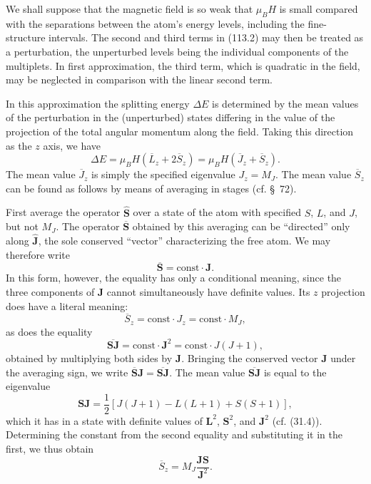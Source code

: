 We shall suppose that the magnetic field is so weak that $\mu_BH$ is small compared with the separations between the atom's energy levels, including the fine-structure intervals. The second and third terms in (113.2) may then be treated as a perturbation, the unperturbed levels being the individual components of the multiplets. In first approximation, the third term, which is quadratic in the field, may be neglected in comparison with the linear second term.

In this approximation the splitting energy $\Delta E$ is determined by the mean values of the perturbation in the (unperturbed) states differing in the value of the projection of the total angular momentum along the field. Taking this direction as the $z$ axis, we have
\begin{equation}
 \Delta E=\mu_BH(\overline L_z+2\overline S_z)=\mu_BH(\overline J_z+\overline S_z).
 \tag{113.4}
\end{equation}
The mean value $\overline J_z$ is simply the specified eigenvalue $J_z=M_J$. The mean value $\overline S_z$ can be found as follows by means of averaging in stages (cf. §~72).

First average the operator $\hat{\mathbf S}$ over a state of the atom with specified $S$, $L$, and $J$, but not $M_J$. The operator $\overline{\mathbf S}$ obtained by this averaging can be ``directed'' only along $\hat{\mathbf J}$, the sole conserved ``vector'' characterizing the free atom. We may therefore write
\[
 \overline{\mathbf S}=\mathrm{const}\cdot\mathbf J.
\]
In this form, however, the equality has only a conditional meaning, since the three components of $\mathbf J$ cannot simultaneously have definite values. Its $z$ projection does have a literal meaning:
\[
 \overline S_z=\mathrm{const}\cdot J_z=\mathrm{const}\cdot M_J,
\]
as does the equality
\[
 \overline{\mathbf S\mathbf J}=\mathrm{const}\cdot\mathbf J^2=\mathrm{const}\cdot J(J+1),
\]
obtained by multiplying both sides by $\mathbf J$. Bringing the conserved vector $\mathbf J$ under the averaging sign, we write $\overline{\mathbf S}\mathbf J=\overline{\mathbf S\mathbf J}$. The mean value $\overline{\mathbf S\mathbf J}$ is equal to the eigenvalue
\[
 \mathbf S\mathbf J=\frac12[J(J+1)-L(L+1)+S(S+1)],
\]
which it has in a state with definite values of $\mathbf L^2$, $\mathbf S^2$, and $\mathbf J^2$ (cf. (31.4)). Determining the constant from the second equality and substituting it in the first, we thus obtain
\begin{equation}
 \overline S_z=M_J\frac{\mathbf J\mathbf S}{\mathbf J^2}.
 \tag{113.5}
\end{equation}


